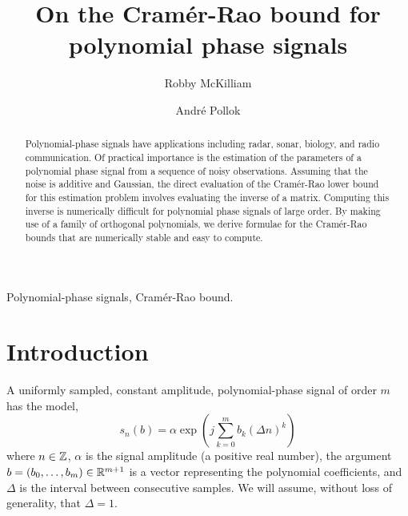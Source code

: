 \documentclass[review]{elsarticle}
\begin{document}
\begin{frontmatter}

\title{On the Cram\'{e}r-Rao bound for polynomial phase signals}

\author{Robby McKilliam} 
\author{Andr\'{e} Pollok}
\address{Institute for Telecommunications Research, The University of South Australia, SA, 5095}
 


\begin{abstract}
Polynomial-phase signals have applications including radar, sonar, biology, and radio communication.  Of practical importance is the estimation of the parameters of a polynomial phase signal from a sequence of noisy observations.  Assuming that the noise is additive and Gaussian, the direct evaluation of the Cram\'{e}r-Rao lower bound for this estimation problem involves evaluating the inverse of a matrix.  Computing this inverse is numerically difficult for polynomial phase signals of large order.  By making use of a family of orthogonal polynomials, we derive formulae for the Cram\'{e}r-Rao bounds that are numerically stable and easy to compute.
\end{abstract}

\begin{keyword}
Polynomial-phase signals, Cram\'{e}r-Rao bound.
\end{keyword}


\end{frontmatter}

\section{Introduction}

A uniformly sampled, constant amplitude, polynomial-phase signal of order $m$ has the model,
\begin{equation}\label{eq:polyestfunction}
s_n(b) = \alpha \exp\left( j \sum_{k = 0}^{m}{b_k (\Delta n)^k}\right)
\end{equation}
where $n \in {\mathbb Z}$, $\alpha$ is the signal amplitude (a positive real number), the argument $b=(b_0, \dots, b_m)\in{\mathbb R}^{m+1}$ is a vector representing the polynomial coefficients,  and $\Delta$ is the interval between consecutive samples.  We will assume, without loss of generality, that $\Delta = 1$.
\end{document}
